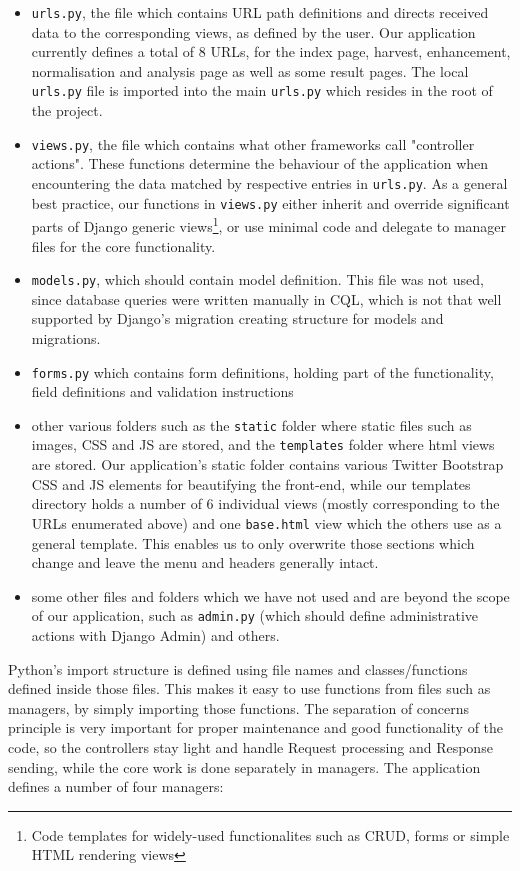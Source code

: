 \documentclass[12pt,a4paper,twoside]{report}
\begin{document}
\begin{itemize}
\item \texttt{urls.py}, the file which contains URL path definitions and directs received data to the corresponding views, as defined by the user. Our application currently defines a total of 8 URLs, for the index page, harvest, enhancement, normalisation and analysis page as well as some result pages. The local \texttt{urls.py} file is imported into the main \texttt{urls.py} which resides in the root of the project.
\item \texttt{views.py}, the file which contains what other frameworks call "controller actions". These functions determine the behaviour of the application when encountering the data matched by respective entries in \texttt{urls.py}. As a general best practice, our functions in \texttt{views.py} either inherit and override significant parts of Django generic views\footnote{Code templates for widely-used functionalites such as CRUD, forms or simple HTML rendering views}, or use minimal code and delegate to manager files for the core functionality.
\item \texttt{models.py}, which should contain model definition. This file was not used, since database queries were written manually in CQL, which is not that well supported by Django's migration creating structure for models and migrations.
\item \texttt{forms.py} which contains form definitions, holding part of the functionality, field definitions and validation instructions
\item other various folders such as the \texttt{static} folder where static files such as images, CSS and JS are stored, and the \texttt{templates} folder where html views are stored. Our application's static folder contains various Twitter Bootstrap CSS and JS elements for beautifying the front-end, while our templates directory holds a number of 6 individual views (mostly corresponding to the URLs enumerated above) and one \texttt{base.html} view which the others use as a general template. This enables us to only overwrite those sections which change and leave the menu and headers generally intact.
\item some other files and folders which we have not used and are beyond the scope of our application, such as \texttt{admin.py} (which should define administrative actions with Django Admin) and others.
\end{itemize}

Python's import structure is defined using file names and classes/functions defined inside those files. This makes it easy to use functions from files such as managers, by simply importing those functions. The separation of concerns principle is very important for proper maintenance and good functionality of the code, so the controllers stay light and handle Request processing and Response sending, while the core work is done separately in managers. The application defines a number of four managers:
\end{document}

